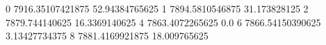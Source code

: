 0 7916.35107421875 52.94384765625
1 7894.5810546875 31.173828125
2 7879.744140625 16.3369140625
4 7863.4072265625 0.0
6 7866.54150390625 3.13427734375
8 7881.4169921875 18.009765625
